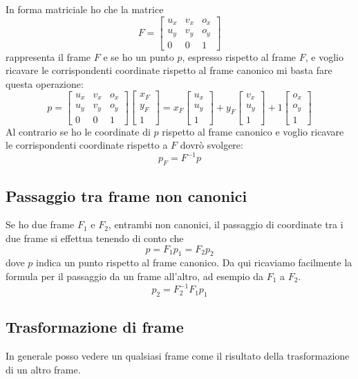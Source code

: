 In forma matriciale ho che la matrice
\[
	F = \begin{bmatrix}
		u_x & v_x & o_x \\
		u_y & v_y & o_y \\
		0   & 0   & 1
	\end{bmatrix}
\]
rappresenta il frame $F$ e se ho un punto $p$, espresso rispetto al frame $F$, e voglio
ricavare le corrispondenti coordinate rispetto al frame canonico mi basta fare questa
operazione:
\[
	p = \begin{bmatrix}
		u_x & v_x & o_x \\
		u_y & v_y & o_y \\
		0   & 0   & 1
	\end{bmatrix}
	\begin{bmatrix}
		x_F \\ y_F \\ 1
	\end{bmatrix} =
	x_F \begin{bmatrix}
		u_x \\ u_y \\ 1
	\end{bmatrix} +
	y_F \begin{bmatrix}
		v_x \\ u_y \\ 1
	\end{bmatrix} +
	1 \begin{bmatrix}
		o_x \\ o_y \\ 1
	\end{bmatrix}
\]
Al contrario se ho le coordinate di $p$ rispetto al frame canonico e voglio ricavare le
corrispondenti coordinate rispetto a $F$ dovr\`o svolgere:
\[ p_F = F^{-1} p \]

\subsection{Passaggio tra frame non canonici}
Se ho due frame $F_1$ e $F_2$, entrambi non canonici, il passaggio di coordinate tra i due frame
si effettua tenendo di conto che
\[ p = F_1 p_1 = F_2 p_2 \]
dove $p$ indica un punto rispetto al frame canonico. Da qui ricaviamo facilmente la formula
per il passaggio da un frame all'altro, ad esempio da $F_1$ a $F_2$.
\[ p_2 = F_2^{-1} F_1 p_1 \]

\subsection{Trasformazione di frame}
In generale posso vedere un qualsiasi frame come il risultato della trasformazione di un altro
frame.

